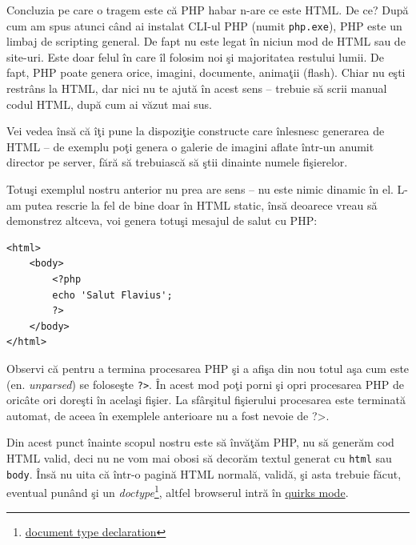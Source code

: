 Concluzia pe care o tragem este că PHP habar n-are ce este HTML. De ce?
După cum am spus atunci când ai instalat CLI-ul PHP (numit \texttt{php.exe}),
PHP este un limbaj de scripting general. De fapt nu este legat în niciun mod de
HTML sau de site-uri. Este doar felul în care îl folosim noi şi majoritatea
restului lumii. De fapt, PHP poate genera orice, imagini, documente, animaţii
(flash). Chiar nu eşti restrâns la HTML, dar nici nu te ajută în acest sens --
trebuie să scrii manual codul HTML, după cum ai văzut mai sus.

Vei vedea însă că îţi pune la dispoziţie constructe care înlesnesc generarea
de HTML -- de exemplu poţi genera o galerie de imagini aflate într-un anumit
director pe server, fără să trebuiască să ştii dinainte numele fişierelor.

Totuşi exemplul nostru anterior nu prea are sens -- nu este nimic dinamic în el.
L-am putea rescrie la fel de bine doar în HTML static, însă deoarece
vreau să demonstrez altceva, voi genera totuşi mesajul de salut cu PHP:
\begin{lstlisting}
<html>
	<body>
		<?php
		echo 'Salut Flavius';
		?>
	</body>
</html>
\end{lstlisting}

Observi că pentru a termina procesarea PHP şi a afişa din nou totul
aşa cum este (en. \textsl{unparsed}) se foloseşte \texttt{?>}.
În acest mod poţi porni şi opri procesarea PHP de oricâte ori doreşti în acelaşi fişier.
La sfârşitul fişierului procesarea este terminată automat, de aceea în exemplele
anterioare nu a fost nevoie de {\glqq}?>{\grqq}.


Din acest punct înainte scopul nostru este să învăţăm PHP, nu să generăm
cod HTML valid, deci nu ne vom mai obosi să decorăm textul generat
cu \texttt{html} sau \texttt{body}. Însă nu uita că într-o pagină HTML
normală, validă, şi asta trebuie făcut, eventual
punând şi un
\textsl{doctype}\footnote{
\href{http://en.wikipedia.org/wiki/Document_Type_Declaration}{document type declaration}}, altfel
browserul intră în \href{http://en.wikipedia.org/wiki/Quirks_mode}{quirks mode}.

